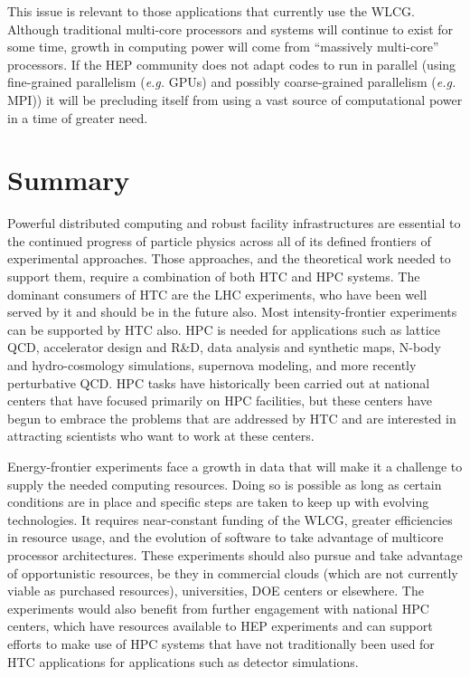 This issue is relevant to those applications that currently use the WLCG. 
Although traditional multi-core processors and systems will continue to exist for some time, 
growth in computing power will come from ``massively multi-core'' processors. If the HEP community does not adapt codes 
to run in parallel (using fine-grained parallelism ({\it e.g.} GPUs) and possibly 
coarse-grained parallelism ({\it e.g.} MPI)) it will be precluding itself from using a vast source 
of computational power in a time of greater need.
 
\section{Summary}
\label{sec:comp-summary}
Powerful distributed computing and robust facility infrastructures are essential to the continued progress of particle physics across all of its defined frontiers of experimental approaches.  Those approaches, and the theoretical work needed to support them, require a combination of both HTC and HPC systems.  The dominant consumers of HTC are the LHC experiments, who have been well served by it and should be in the future also.  Most intensity-frontier experiments can be supported by HTC also.  HPC is needed for applications such as lattice QCD, accelerator design and R\&D, data analysis and synthetic maps, N-body and hydro-cosmology simulations, supernova modeling, and more recently perturbative QCD.  HPC tasks have historically been carried out at national centers that have focused primarily on HPC facilities, but these centers have begun to embrace the problems that are addressed by HTC and are interested in attracting scientists who want to work at these centers.

Energy-frontier experiments face a growth in data that will make it a challenge to supply the needed computing resources.  Doing so is possible as long as certain conditions are in place and specific steps are taken to keep up with evolving technologies.  It requires near-constant funding of the WLCG, greater efficiencies in resource usage, and the evolution of software to take advantage of multicore processor architectures.  These experiments should also pursue and take advantage of opportunistic resources, be they in commercial clouds (which are not currently viable as purchased resources), universities, DOE centers or elsewhere.  The experiments would also benefit from further engagement with national HPC centers, which have resources available to HEP experiments and can support efforts to make use of HPC systems that have not traditionally been used for HTC applications for applications such as detector simulations.

